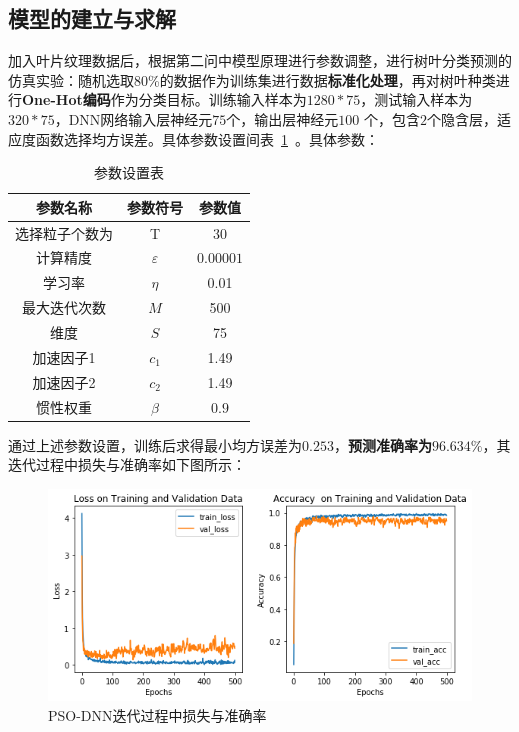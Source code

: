 \documentclass{whutmod}
\begin{document}
    \subsection{模型的建立与求解}
    加入叶片纹理数据后，根据第二问中模型原理进行参数调整，进行树叶分类预测的仿真实验：随机选取80\%的数据作为训练集进行数据\textbf{标准化处理}，再对树叶种类进行\textbf{One-Hot编码}作为分类目标。训练输入样本为$1280*75$，测试输入样本为$320*75$，DNN网络输入层神经元$75$个，输出层神经元$100$ 个，包含$2$个隐含层，适应度函数选择均方误差。具体参数设置间表~\ref{canshu2}~。具体参数：
    \begin{table}[H]
    	\centering		\caption{参数设置表}\label{canshu2}
    	\begin{tabular}{ccc}
    		\toprule[2pt]
    		\multicolumn{1}{m{4cm}}{\centering 参数名称}
    		& \multicolumn{1}{m{3cm}}{\centering 参数符号}
    		&\multicolumn{1}{m{3cm}}{\centering 参数值}
    		\\
    		\midrule[1pt]
    		选择粒子个数为	 &  T &$30$ \\ 
    		计算精度	 &  $\varepsilon$&$0.00001$  \\ 
    		学习率	 &  $\eta $ &0.01 \\ 
    		最大迭代次数	 &  $M$ &500\\ 
    		维度	 &  $S$ &75 \\ 
    		加速因子1	 &  $c_{1}$ &1.49\\ 
    		加速因子2	 &  $c_{2}$ &1.49 \\ 
    		惯性权重	 &  $\beta $ &$0.9$ \\ 
    		\bottomrule[2pt]	
    	\end{tabular}
        \end{table}
    
    
    通过上述参数设置，训练后求得最小均方误差为$0.253$，\textbf{预测准确率为$96.634\%$}，其迭代过程中损失与准确率如下图所示：
    \begin{figure}[H]
    	\centering
    	\includegraphics[width=\textwidth]{figures/moxingsan.png}
    	\caption{PSO-DNN迭代过程中损失与准确率}\label{xxxx}
    \end{figure}	
    
\end{document}

